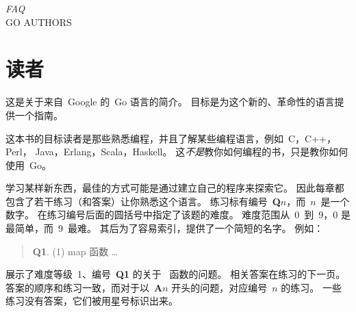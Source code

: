 {\textit{FAQ}\\ \textsc{GO AUTHORS}}

\section{读者}
\noindent{}这是关于来自~Google 的~Go 语言的简介。
目标是为这个新的、革命性的语言提供一个指南。

这本书的目标读者是那些熟悉编程，并且了解某些编程语言，例如~C\cite{c}，C++\cite{c++}，\\ 
Perl\cite{perl}， Java\cite{java}，Erlang\cite{erlang}，Scala\cite{scala}，Haskell\cite{haskell}。
这\emph{不是}教你如何编程的书，只是教你如何使用~Go。

学习某样新东西，最佳的方式可能是通过建立自己的程序来探索它。
因此每章都包含了若干练习（和答案）让你熟悉这个语言。
练习标有编号~\textbf{Q$n$}，而~$n$~是一个数字。 
在练习编号后面的圆括号中指定了该题的难度。
难度范围从~0~到~9，0 是最简单，而~9~最难。
其后为了容易索引，提供了一个简短的名字。
例如：
\begin{verse}
\textbf{Q1}. (1) map 函数 \ldots
\end{verse}
展示了难度等级~1、编号~\textbf{Q1} 的关于~ 函数的问题。
相关答案在练习的下一页。
答案的顺序和练习一致，而对于以~\textbf{A$n$} 开头的问题，对应编号~$n$ 的练习。
一些练习没有答案，它们被用星号标识出来。

